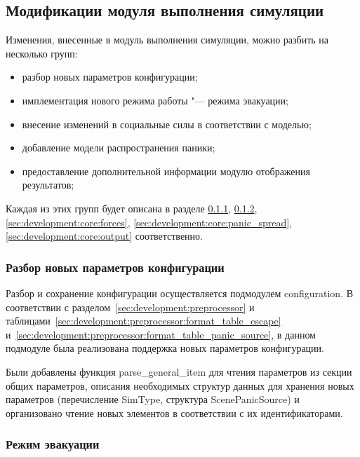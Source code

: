 \FloatBarrier

\subsection{Модификации модуля выполнения симуляции}
\label{sec:development:core}

Изменения, внесенные в модуль выполнения симуляции, можно разбить на несколько групп:

\begin{itemize}
  \item разбор новых параметров конфигурации;
  \item имплементация нового режима работы "--- режима эвакуации;
  \item внесение изменений в социальные силы в соответствии с моделью;
  \item добавление модели распространения паники;
  \item предоставление дополнительной информации модулю отображения результатов;
\end{itemize}

Каждая из этих групп будет описана в разделе \ref{sec:development:core:configuration},
\ref{sec:development:core:escape}, \ref{sec:development:core:forces},
\ref{sec:development:core:panic_spread}, \ref{sec:development:core:output} соответственно.


\subsubsection{Разбор новых параметров конфигурации}
\label{sec:development:core:configuration}

Разбор и сохранение конфигурации осуществляется подмодулем con\-fi\-gu\-ra\-ti\-on.
В соответствии с разделом~\ref{sec:development:preprocessor}
и таблицами~\ref{sec:development:preprocessor:format_table_escape} и~\ref{sec:development:preprocessor:format_table_panic_source},
в данном подмодуле была реализована поддержка новых параметров конфигурации.

Были добавлены функция par\-se\_ge\-ne\-ral\_item для чтения параметров из секции общих параметров,
описания необходимых структур данных для хранения новых параметров (перечисление Sim\-Ty\-pe, структура Sce\-ne\-Pa\-nicSo\-urce)
и организовано чтение новых элементов в соответствии с их идентификаторами.

\subsubsection{Режим эвакуации}
\label{sec:development:core:escape}

